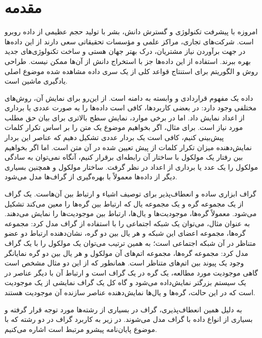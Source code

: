 \clearpage
{}
\chapter*{مقدمه}

امروزه با پیشرفت تکنولوژی و گسترش دانش، بشر با تولید حجم عظیمی از داده روبرو است. شرکت‌های تجاری، مراکز علمی و مؤسسات تحقیقاتی سعی دارند از این داده‌ها در جهت برآوردن نیاز مشتریان، درک بهتر جهان هستی و ساخت تکنولوژی‌های جدید بهره ببرند. استفاده از این داده‌ها جز با استخراج دانش از آن‌ها ممکن نیست. طراحی روش و الگوریتم  برای استنتاج قواعد کلی از یک سری داده مشاهده شده موضوع اصلی یادگیری ماشین است.

داده یک مفهوم قراردادی و وابسته به دامنه است. از این‌رو برای نمایش آن، روش‌های مختلفی وجود دارد: در بعضی کاربردها، کافی است داده‌ها را به صورت عددی یا برداری از اعداد نمایش داد. اما در برخی موارد، نمایش سطح بالاتری برای بیان حق مطلب مورد نیاز است. برای مثال، اگر بخواهیم موضوع یک متن را بر اساس تکرار کلمات پیش‌بینی کنیم، کافی است یک بردار عددی تشکیل دهیم که عناصر این بردار نمایش‌دهنده میزان تکرار کلمات از پیش تعیین شده در آن متن است. اما اگر بخواهیم بین رفتار یک مولکول با ساختار آن رابطه‌ای برقرار کنیم، آنگاه نمی‌توان به سادگی مولکول را یک عدد یا برداری از اعداد در نظر گرفت. ساختار مولکول و همچنین بسیاری دیگر از داده‌ها معمولاً با بهره‌گیری از گراف‌ها مدل می‌شود.

گراف ابزاری ساده و انعطاف‌پذیر برای توصیف اشیاء و ارتباط بین آن‌هاست. یک گراف از یک مجموعه گره‌ و یک مجموعه یال‌ که ارتباط بین گره‌ها را معین می‌کند تشکیل می‌شود. معمولاً  گره‌ها، موجودیت‌ها و یال‌ها، ارتباط بین موجودیت‌ها را نمایش می‌دهند. به عنوان مثال، می‌توان یک شبکه اجتماعی را با استفاده از گراف مدل کرد: مجموعه گره‌ها، مجموعه اعضای این شبکه و هر یال بین دو گره، نشان‌دهنده ارتباط دو عضو متناظر در آن شبکه اجتماعی است؛ به همین ترتیب می‌توان یک مولکول را با یک گراف مدل کرد: مجموعه گره‌ها، مجموعه اتم‌های آن مولکول و هر یال بین دو گره نمایانگر وجود یک پیوند بین اتم‌های متناظر است. همانطور که از این دو مثال مشخص است گاهی موجودیت مورد مطالعه، یک گره در یک گراف است و ارتباط آن با دیگر عناصر در یک سیستم بزرگتر نمایش‌داده می‌شود و گاه کل یک گراف نمایشی از یک موجودیت است که در این حالت، گره‌ها و یال‌ها نمایش‌دهنده عناصر سازنده آن موجودیت هستند.

به دلیل همین انعطاف‌پذیری، گراف در بسیاری از رشته‌ها مورد توجه قرار گرفته و بسیاری از انواع داده با گراف مدل می‌شوند. در زیر به کاربرد گراف در دو رشته که با موضوع پایان‌نامه پیشرو مرتبط است اشاره می‌کنیم.

